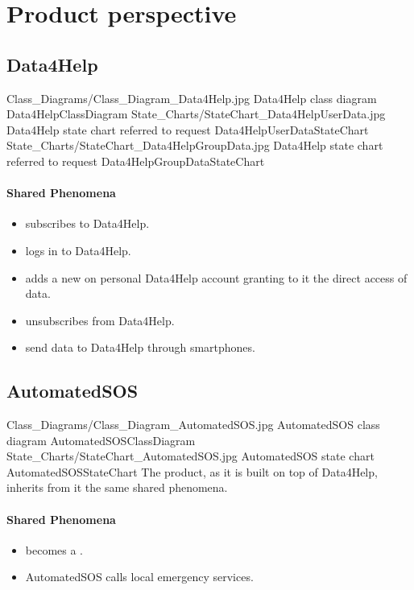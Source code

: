 \documentclass[../../rasd.tex]{subfiles}
\begin{document}
	
	\section{Product perspective}

		\subsection{Data4Help\label{sect:2.1.1}}

			\image {10cm} {Class_Diagrams/Class_Diagram_Data4Help.jpg} {Data4Help class diagram} {Data4HelpClassDiagram}
			\image {10cm} {State_Charts/StateChart_Data4HelpUserData.jpg} {Data4Help state chart referred to  request} {Data4HelpUserDataStateChart}
			\image {10cm} {State_Charts/StateChart_Data4HelpGroupData.jpg} {Data4Help state chart referred to  request} {Data4HelpGroupDataStateChart}

			\paragraph{Shared Phenomena}
			\begin{itemize}
				\item {} subscribes to Data4Help.
				\item {} logs in to Data4Help.
				\item {} adds a new  on personal Data4Help account granting to it the direct access of data.
				\item {} unsubscribes from Data4Help.
				\item {} send data to Data4Help through smartphones.
			\end{itemize}

		\subsection{AutomatedSOS\label{sect:2.1.2}}

			\image {10cm} {Class_Diagrams/Class_Diagram_AutomatedSOS.jpg} {AutomatedSOS class diagram} {AutomatedSOSClassDiagram}
			\image {10cm} {State_Charts/StateChart_AutomatedSOS.jpg} {AutomatedSOS state chart} {AutomatedSOSStateChart}
			The product, as it is built on top of Data4Help, inherits from it the same shared phenomena.

			\paragraph{Shared Phenomena}
			\begin{itemize}
				\item {} becomes a .
				\item AutomatedSOS calls local emergency services.
			\end{itemize}
\end{document}

